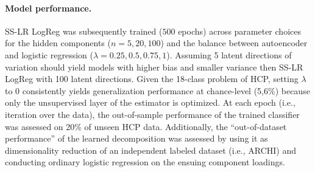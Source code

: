 \documentclass{article} %
\begin{document}
\paragraph{Model performance.}
SS-LR LogReg was subsequently trained ($500$ epochs) across parameter choices
for the hidden components ($n=5, 20, 100$) and
the balance between autoencoder and logistic regression
($\lambda=0.25, 0.5, 0.75, 1$).
Assuming 5 latent directions of variation should yield models with
higher bias and smaller variance then SS-LR LogReg with 100 latent directions.
%
Given the 18-class problem of HCP, setting $\lambda$ to $0$
consistently yields generalization performance
at chance-level (5,6\%) because
only the unsupervised layer of the estimator is optimized.
%
At each epoch (i.e., iteration over the data),
the out-of-sample performance of the trained classifier
was assessed on 20\% of unseen HCP data.
Additionally, the ``out-of-dataset performance'' of the learned decomposition
was assessed by using it as dimensionality reduction of an
independent labeled dataset (i.e., ARCHI) and conducting ordinary
logistic regression on the ensuing component loadings.
\end{document}
